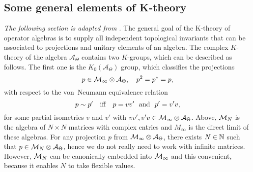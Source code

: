 \documentclass[
    aps,
    prb,
    twocolumn,
    floatfix,
    superscriptaddress,
	10pt
]{revtex4-2}
\begin{document}
\subsection{Some general elements of K-theory}

{\it The following section is adapted from \cite{Liu2020}}. The general goal of the K-theory of operator algebras is to supply all independent topological invariants that can be associated to projections and unitary elements of an algebra.
The complex $K$-theory of  the algebra $\mathcal{A}_\Theta$ contains two $K$-groups, which can be described as follows. 
The first one is the $K_0(\mathcal{A}_\Theta)$ group, which classifies the projections
\begin{equation}
p \in {\mathcal M}_\infty \otimes {\mathcal A}_\Theta, \quad p^2 = p^\ast=p,
\end{equation}
with respect to the von~Neumann equivalence relation
\begin{equation}\label{Eq-EquivRelation}
p \sim p' \quad \mbox{iff}  \quad p=vv' \ \  {\rm and} \ \ p' = v'v, 
\end{equation}
for some partial isometries $v$ and $v'$ with  $ vv', v'v \in {\mathcal M}_\infty \otimes {\mathcal A}_\Theta$. Above, ${\mathcal M}_N$ is the algebra of $N \times N$ matrices with complex entries and $M_\infty$ is the direct limit of these algebras. For any projection $p$ from ${\mathcal M}_\infty \otimes {\mathcal A}_\Theta$, there exists $N \in {\mathbb N}$ such that $p \in {\mathcal M}_N \otimes {\mathcal A}_\Theta$, hence we do not really need to work with infinite matrices. However, ${\mathcal M}_N$ can be canonically embedded into ${\mathcal M}_\infty$ and this convenient, because it enables $N$ to take flexible values.

\vspace{0.2cm}
\end{document}
